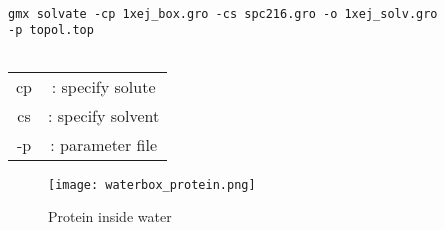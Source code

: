 \begin{verbatim}

gmx solvate -cp 1xej_box.gro -cs spc216.gro -o 1xej_solv.gro 
-p topol.top 
    
\end{verbatim}
\begin{tabular}{c c}
cp & : specify solute \\
cs & : specify solvent\\
-p & : parameter file\\
\end{tabular}
\begin{figure}[h]
\centering
\texttt{[image: waterbox\_protein.png]}
\caption{Protein inside water}

\end{figure}

